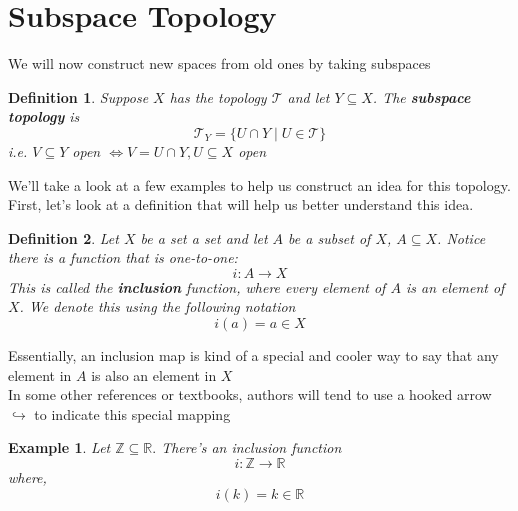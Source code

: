 \documentclass{article}
\newtheorem*{definition*}{Definition}
\newtheorem*{example*}{Example}
\begin{document}
\newpage
\section*{Subspace Topology}
We will now construct new spaces from old ones by taking subspaces
\begin{tcolorbox}[colback=definition!65]
    \begin{definition*}
    Suppose $X$ has the topology $\mathcal{T}$ and let $Y \subseteq X$. The \textbf{subspace topology} is
    \[
    \mathcal{T}_Y = \{U \cap Y \mid U \in \mathcal{T}\}
    \]
    i.e. $V \subseteq Y$ open $\Longleftrightarrow V = U \cap Y, U \subseteq X$ open
    \end{definition*}
\end{tcolorbox}

We'll take a look at a few examples to help us construct an idea for this topology. \\

First, let's look at a definition that will help us better understand this idea.

\begin{tcolorbox}[colback=definition!65]
    \begin{definition*}
        Let $X$ be a set a set and let $A$ be a subset of $X$, $A \subseteq X$. Notice there is a function that is one-to-one:
        \[
        i: A \rightarrow X
        \]
        This is called the \textbf{inclusion} function, where every element of $A$ is an element of $X$. We denote this using the following notation
        \[
        i(a) = a \in X
        \]
    \end{definition*}
\end{tcolorbox}
Essentially, an inclusion map is kind of a special and cooler way to say that any element in $A$ is also an element in $X$ \\

In some other references or textbooks, authors will tend to use a hooked arrow $\hookrightarrow$ to indicate this special mapping

\begin{tcolorbox}[colback=example!65]
    \begin{example*}
       Let $\mathbb{Z} \subseteq \mathbb{R}.$ There's an inclusion function 
       \[
       i: \mathbb{Z} \rightarrow \mathbb{R}
       \]
       where,
       \[
       i(k) = k \in \mathbb{R}
       \]
    \end{example*}
\end{tcolorbox}
\end{document}
